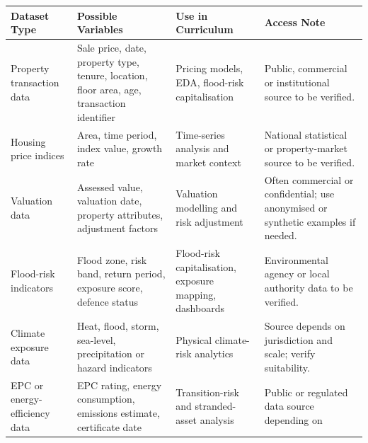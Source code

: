 \documentclass[
  a4paper,
]{article}
\newcounter{none} %
\begin{document}
{\def\LTcaptype{none} %
\begin{longtable}[]{@{}
  >{\raggedright\arraybackslash}p{}
  >{\raggedright\arraybackslash}p{}
  >{\raggedright\arraybackslash}p{}
  >{\raggedright\arraybackslash}p{}@{}}
\toprule\noalign{}
\begin{minipage}[b]{\linewidth}\raggedright
Dataset Type
\end{minipage} & \begin{minipage}[b]{\linewidth}\raggedright
Possible Variables
\end{minipage} & \begin{minipage}[b]{\linewidth}\raggedright
Use in Curriculum
\end{minipage} & \begin{minipage}[b]{\linewidth}\raggedright
Access Note
\end{minipage} \\
\midrule\noalign{}
\endhead
\bottomrule\noalign{}
\endlastfoot
Property transaction data & Sale price, date, property type, tenure,
location, floor area, age, transaction identifier & Pricing models, EDA,
flood-risk capitalisation & Public, commercial or institutional source
to be verified. \\
Housing price indices & Area, time period, index value, growth rate &
Time-series analysis and market context & National statistical or
property-market source to be verified. \\
Valuation data & Assessed value, valuation date, property attributes,
adjustment factors & Valuation modelling and risk adjustment & Often
commercial or confidential; use anonymised or synthetic examples if
needed. \\
Flood-risk indicators & Flood zone, risk band, return period, exposure
score, defence status & Flood-risk capitalisation, exposure mapping,
dashboards & Environmental agency or local authority data to be
verified. \\
Climate exposure data & Heat, flood, storm, sea-level, precipitation or
hazard indicators & Physical climate-risk analytics & Source depends on
jurisdiction and scale; verify suitability. \\
EPC or energy-efficiency data & EPC rating, energy consumption,
emissions estimate, certificate date & Transition-risk and
stranded-asset analysis & Public or regulated data source depending on

\end{longtable}}
\end{document}
